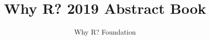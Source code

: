 \usepackage[utf8]{inputenc}

\title{Why R? 2019 Abstract Book}
\date{}
\author{Why R? Foundation}

\newpage

% 

